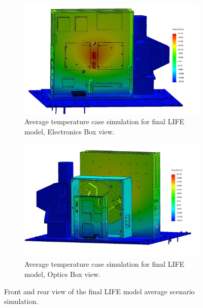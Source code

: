 \begin{figure}
    \centering
    \begin{subfigure}[h]{0.9\textwidth}
        \centering
        \includegraphics[width=\textwidth]{chap3_images/LIFE_V5_initial_images/Iteration_2_ebox_no_labels.JPG}
        \caption{Average temperature case simulation for final LIFE model, Electronics Box view.}
        \label{fig:LIFE_V5_FINAL_TA_AVG_EBOX}
    \end{subfigure}
    \begin{subfigure}[h]{0.9\textwidth}
        \centering
        \includegraphics[width=\textwidth]{chap3_images/LIFE_V5_initial_images/Iteration_2_no_labels.JPG}
        \caption{Average temperature case simulation for final LIFE model, Optics Box view.}
        \label{fig:LIFE_V5_FINAL_TA_AVG_OBOX}
    \end{subfigure}
    \caption{Front and rear view of the final LIFE model average scenario simulation.}
    \label{LIFE_V5_FINAL_TA_AVG}
\end{figure}

